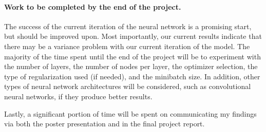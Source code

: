 \documentclass[12pt]{article}
\begin{document}
\paragraph{Work to be completed by the end of the project.} 
The success of the current iteration of the neural network is a promising start, but should be improved upon. 
Most importantly, our current results indicate that there may be a variance problem with our current iteration
of the model. The majority of the time spent until the end of the project will be to experiment with the number of 
layers, the number of nodes per layer, the optimizer selection, the type of regularization used (if 
needed), and the minibatch size. In addition, other types of neural network architectures will be 
considered, such as convolutional neural networks, if they produce better results.

Lastly, a significant portion of time will be spent on communicating my findings via both the poster
presentation and in the final project report.


\newpage

\end{document}
